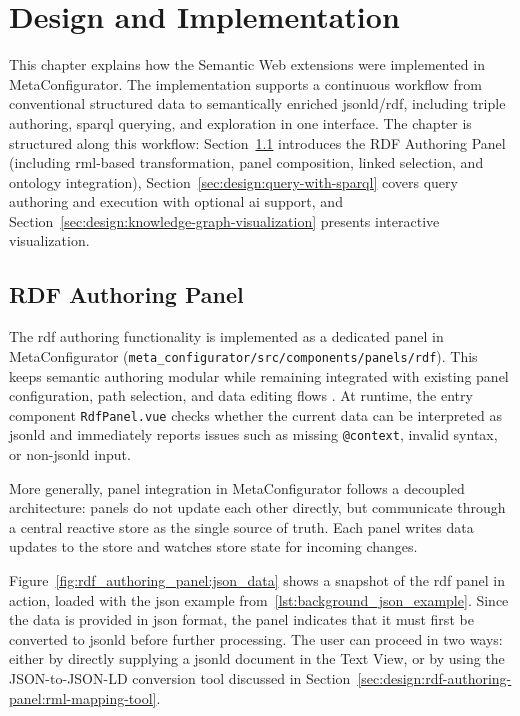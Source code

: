 \chapter{Design and Implementation}\label{sec:design}

This chapter explains how the Semantic Web extensions were implemented in MetaConfigurator. The implementation supports a continuous workflow from conventional structured data to semantically enriched \gls{jsonld}/\gls{rdf}, including triple authoring, \gls{sparql} querying, and  exploration in one interface. The chapter is structured along this workflow: Section~\ref{sec:design:rdf-authoring-panel} introduces the RDF Authoring Panel (including \gls{rml}-based transformation, panel composition, linked selection, and ontology integration), Section~\ref{sec:design:query-with-sparql} covers query authoring and execution with optional \gls{ai} support, and Section~\ref{sec:design:knowledge-graph-visualization} presents interactive  visualization.

\section{RDF Authoring Panel}\label{sec:design:rdf-authoring-panel}

The \gls{rdf} authoring functionality is implemented as a dedicated panel in MetaConfigurator (\texttt{meta\_configurator/src/components/panels/rdf}). This keeps semantic authoring modular while remaining integrated with existing panel configuration, path selection, and data editing flows \cite{metaconfigurator2024}. At runtime, the entry component \texttt{RdfPanel.vue} checks whether the current data can be interpreted as \gls{jsonld} and immediately reports issues such as missing \texttt{@context}, invalid syntax, or non-\gls{jsonld} input.

More generally, panel integration in MetaConfigurator follows a decoupled architecture: panels do not update each other directly, but communicate through a central reactive store as the single source of truth. Each panel writes data updates to the store and watches store state for incoming changes.

Figure~\ref{fig:rdf_authoring_panel:json_data} shows a snapshot of the \gls{rdf} panel in action, loaded with the \gls{json} example from~\ref{lst:background_json_example}. Since the data is provided in \gls{json} format, the panel indicates that it must first be converted to \gls{jsonld} before further processing. The user can proceed in two ways: either by directly supplying a \gls{jsonld} document in the Text View, or by using the JSON-to-JSON-LD conversion tool discussed in Section~\ref{sec:design:rdf-authoring-panel:rml-mapping-tool}.


